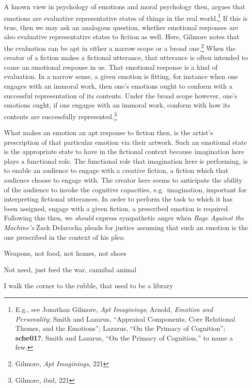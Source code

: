 \documentclass[phdthesis,12pt,final]{wuthesis}
\theoremstyle{definition}
\theoremstyle{definition}
\theoremstyle{definition}
\theoremstyle{definition}
\theoremstyle{remark}
\begin{document}
A known view in psychology of emotions and moral psychology then, argues that emotions are evaluative representative states of things in the real world.\footnote{E.g., see Jonathan Gilmore, \emph{Apt {Imaginings}}; Arnold, \emph{Emotion and {Personality}}; Smith and Lazarus, {``Appraisal {Components}, {Core Relational Themes}, and the {Emotions}''}; Lazarus, {``On the {Primacy} of {Cognition}''}; \textbf{sche01?}; Smith and Lazarus, {``On the {Primacy} of {Cognition},''} to name a few.} If this is true, then we may ask an analogous question, whether emotional responses are also evaluative representative states to fiction as well. Here, Gilmore notes that the evaluation can be apt in either a narrow scope or a broad one.\footnote{Gilmore, \emph{Apt {Imaginings}}, 221} When the creator of a fiction makes a fictional utterance, that utterance is often intended to cause an emotional response in us. That emotional response is a kind of evaluation. In a narrow sense, a given emotion is fitting, for instance when one engages with an immoral work, then one's emotions ought to conform with a successful representation of its contents. Under the broad scope however, one's emotions ought, if one engages with an immoral work, conform with how its contents are successfully represented.\footnote{Gilmore, ibid, 221}

What makes an emotion an apt response to fiction then, is the artist's prescription of that particular emotion via their artwork. Such an emotional state is the appropriate state to have in the fictional context because imagination here plays a functional role. The functional role that imagination here is performing, is to enable an audience to engage with a creative fiction, a fiction which that audience choose to engage with. The creator here seems to anticipate the ability of the audience to invoke the cognitive capacities, e.g.~imagination, important for interpreting fictional utterances. In order to perform the task to which it has been assigned, engage with a given fiction, a prescribed emotion is required. Following this then, we \emph{should} express sympathetic anger when \emph{Rage Against the Machine's} Zack Delarocha pleads for justice assuming that such an emotion is the one prescribed in the context of his plea:

Weapons, not food, not homes, not shoes

Not need, just feed the war, cannibal animal

I walk the corner to the rubble, that used to be a library
\end{document}
